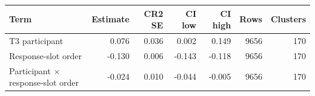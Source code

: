 
\begin{tabular}{lrrrrrr}
\toprule
Term & Estimate & CR2 SE & CI low & CI high & Rows & Clusters\\
\midrule
T3 participant & 0.076 & 0.036 & 0.002 & 0.149 & 9656 & 170\\
Response-slot order & -0.130 & 0.006 & -0.143 & -0.118 & 9656 & 170\\
Participant $\times$ response-slot order & -0.024 & 0.010 & -0.044 & -0.005 & 9656 & 170\\
\bottomrule
\end{tabular}
